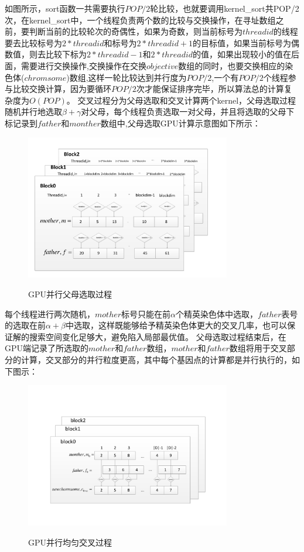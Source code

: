   如图所示，sort函数一共需要执行$POP/2$轮比较，也就要调用kernel\_sort共POP/2次，在kernel\_sort中，一个线程负责两个数的比较与交换操作，在寻址数组之前，要判断当前的比较轮次的奇偶性，如果为奇数，则当前标号为$threadid$的线程要去比较标号为$2*threadid$和标号为$2*threadid+1$的目标值，如果当前标号为偶数值，则去比较下标为$2*threadid-1$和$2*threadid$的值，如果出现较小的值在后面，需要进行交换操作,交换操作在交换$objective$数组的同时，也要交换相应的染色体($chromsome$)数组,这样一轮比较达到并行度为$POP/2$,一个有$POP/2$个线程参与比较交换计算，因为要循环$POP/2$次才能保证排序完毕，所以算法总的计算复杂度为$O(POP)$。
  交叉过程分为父母选取和交叉计算两个kernel，父母选取过程随机并行地选取$\beta+\gamma$对父母，每个线程负责选取一对父母，并且将选取的父母下标记录到$father$和$monther$数组中,父母选取GPU计算示意图如下所示：
\begin{figure}
  \begin{center}
    {\includegraphics[width=0.8\textwidth]{figures/choose.pdf}}
    \end{center}
  \caption{{\footnotesize{GPU并行父母选取过程}}}
  \label{IterNum}
\end{figure}  
  每个线程进行两次随机，$mother$标号只能在前$\alpha$个精英染色体中选取，$father$表号的选取在前$\alpha+\beta$中选取，这样既能够给予精英染色体更大的交叉几率，也可以保证解的搜索空间变化足够大，避免陷入局部最优值。
  父母选取过程结束后，在GPU端记录了所选取的$mother$和$father$数组，$mother$和$father$数组将用于交叉部分的计算，交叉部分的并行粒度更高，其中每个基因点的计算都是并行执行的，如下图示：
\begin{figure}
  \begin{center}
    {\includegraphics[width=0.8\textwidth]{figures/GPUcross.pdf}}
    \end{center}
  \caption{{\footnotesize{GPU并行均匀交叉过程}}}
  \label{IterNum}
\end{figure}

